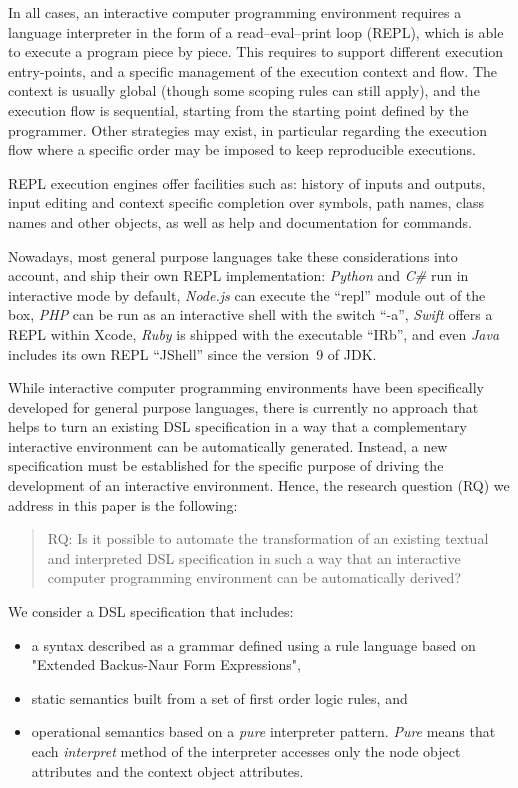 In all cases, an interactive computer programming environment requires a language interpreter in the form of a read–eval–print loop (REPL), which is able to execute a program piece by piece.  This requires to support different execution entry-points, and a specific management of the execution context and flow. The context is usually global (though some scoping rules can still apply), and the execution flow is sequential, starting from the starting point defined by the programmer. Other strategies may exist, in particular regarding the execution flow where a specific order may be imposed to keep reproducible executions. 

REPL execution engines offer facilities such as: history of inputs and outputs, input editing and context specific completion over symbols, path names, class names and other objects, as well as help and documentation for commands.

Nowadays, most general purpose languages take these considerations into account, and ship their own REPL implementation: \emph{Python} and \emph{C\#} run in interactive mode by default, \emph{Node.js} can execute the ``repl'' module out of the box, \emph{PHP} can be run as an interactive shell with the switch ``-a'', \emph{Swift} offers a REPL within Xcode, \emph{Ruby} is shipped with the executable ``IRb'', and even \emph{Java} includes its own REPL ``JShell'' since the version~9 of JDK.

While interactive computer programming environments have been specifically developed for general purpose languages, there is currently no approach that helps to turn an existing DSL specification in a way that a complementary interactive environment can be automatically generated. Instead, a new specification must be established for the specific purpose of driving the development of an interactive environment. Hence, the research question (RQ) we address in this paper is the following: 
	\begin{quote}
	RQ: Is it possible to automate the transformation of an existing textual and interpreted DSL specification in such a way that an interactive computer programming environment can be automatically derived? 
	\end{quote}
	
	We consider a DSL specification that includes:
	\begin{itemize}
		\item a syntax described as a grammar defined using a rule language based on "Extended Backus-Naur Form Expressions",
		\item static semantics built from a set of first order logic rules, and
		\item operational semantics based on a \textit{pure} interpreter pattern. \textit{Pure} means that each \textit{interpret} method of the interpreter accesses only the node object 	attributes and the context object attributes.
	\end{itemize}

